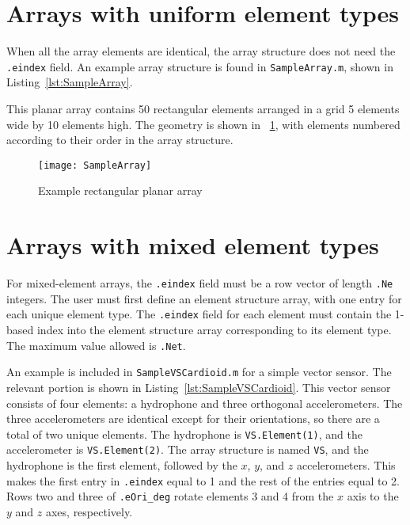\section{Arrays with uniform element types}

When all the array elements are identical, the array structure does not need the \texttt{.eindex} field. An example array structure is found in \texttt{SampleArray.m}, shown in Listing~\ref{lst:SampleArray}.



This planar array contains 50 rectangular elements arranged in a grid 5 elements wide by 10 elements high. The geometry is shown in \figname~\ref{fig:SampleArray}, with elements numbered according to their order in the array structure.

\begin{figure}[!ht]
\begin{center}
\texttt{[image: SampleArray]}
\caption{\label{fig:SampleArray}Example rectangular planar array}
\end{center}
\end{figure}

\clearpage
\section{Arrays with mixed element types}

For mixed-element arrays, the \texttt{.eindex} field must be a row vector of length \texttt{.Ne} integers. The user must first define an element structure array, with one entry for each unique element type. The \texttt{.eindex} field for each element must contain the 1-based index into the element structure array corresponding to its element type. The maximum value allowed is \texttt{.Net}.

An example is included in \texttt{SampleVSCardioid.m} for a simple vector sensor. The relevant portion is shown in Listing~\ref{lst:SampleVSCardioid}. This vector sensor consists of four elements: a hydrophone and three orthogonal accelerometers. The three accelerometers are identical except for their orientations, so there are a total of two unique elements. The hydrophone is \texttt{VS.Element(1)}, and the accelerometer is \texttt{VS.Element(2)}. The array structure is named \texttt{VS}, and the hydrophone is the first element, followed by the $x$, $y$, and $z$ accelerometers. This makes the first entry in \texttt{.eindex} equal to 1 and the rest of the entries equal to 2. Rows two and three of \texttt{.eOri\_deg} rotate elements 3 and 4 from the $x$ axis to the $y$ and $z$ axes, respectively.


